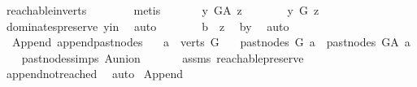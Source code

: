 \begin{isabellebody}
\ reachable{}{\isacharunderscore}{\kern0pt}in{\isacharunderscore}{\kern0pt}verts{\isacharparenleft}{\kern0pt}{}{\isacharparenright}{\kern0pt}\isanewline
\ \ \ \ \ \ \isamarkupfalse%
\ {\isacharparenleft}{\kern0pt}metis{\isacharparenright}{\kern0pt}\ \isanewline
\ \ \ \ \isamarkupfalse%
\ {\isachardoublequoteopen}y\ {\isasymrightarrow}\isactrlbsub G{\isacharunderscore}{\kern0pt}A\isactrlesub \ z{\isachardoublequoteclose}\isanewline
\ \ \ \ \isamarkupfalse%
\ \isamarkupfalse%
\ {\isachardoublequoteopen}y\ {\isasymrightarrow}\isactrlbsub G\isactrlesub \ z{\isachardoublequoteclose}\ \isamarkupfalse%
\ dominates{\isacharunderscore}{\kern0pt}preserve\ y{\isacharunderscore}{\kern0pt}in\ \isamarkupfalse%
\ auto\isanewline
\ \ \ \ \isamarkupfalse%
\ \isamarkupfalse%
\ {\isachardoublequoteopen}b\ {\isasymrightarrow}\isactrlsup {\isacharplus}{\kern0pt}\ z{\isachardoublequoteclose}\ \isamarkupfalse%
\ b{\isacharunderscore}{\kern0pt}y\ \isamarkupfalse%
\ auto\isanewline
\ \ \isamarkupfalse%
\isanewline
{}\isamarkupfalse%
%
\endisatagproof
{\isafoldproof}%
%
\isadelimproof
\isanewline
%
\endisadelimproof
\isanewline
{}\isamarkupfalse%
\ {\isacharparenleft}{\kern0pt}\ Append{\isacharparenright}{\kern0pt}\ append{\isacharunderscore}{\kern0pt}past{\isacharunderscore}{\kern0pt}nodes{\isacharcolon}{\kern0pt}\isanewline
\ \ \ {\isachardoublequoteopen}a\ {\isasymin}\ verts\ G{\isachardoublequoteclose}\isanewline
\ \ \ {\isachardoublequoteopen}past{\isacharunderscore}{\kern0pt}nodes\ G\ a\ {\isacharequal}{\kern0pt}\ past{\isacharunderscore}{\kern0pt}nodes\ G{\isacharunderscore}{\kern0pt}A\ a{\isachardoublequoteclose}\isanewline
%
\isadelimproof
\ \ %
\endisadelimproof
%
\isatagproof
{}\isamarkupfalse%
\ past{\isacharunderscore}{\kern0pt}nodes{\isachardot}{\kern0pt}simps\ A{\isacharunderscore}{\kern0pt}union\ \isamarkupfalse%
\ \isanewline
\ \ \ \ assms\ reachable{}{\isacharunderscore}{\kern0pt}preserve\isanewline
\ \ \isamarkupfalse%
\ append{\isacharunderscore}{\kern0pt}not{\isacharunderscore}{\kern0pt}reached\ \isamarkupfalse%
\ auto%
\endisatagproof
{\isafoldproof}%
%
\isadelimproof
\isanewline
%
\endisadelimproof
\isanewline
\isanewline
{}\isamarkupfalse%
\ Append\isanewline
{}\isanewline

\end{isabellebody}
